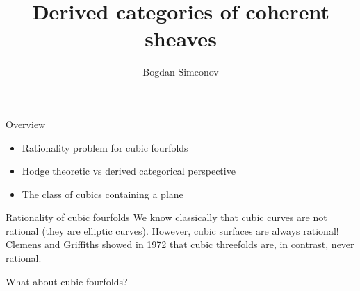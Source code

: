 \documentclass[10pt]{beamer}
\title{Derived categories of coherent sheaves}
\date{}
\author{Bogdan Simeonov}
\begin{document}
\maketitle

\begin{frame}{Overview}
    \begin{itemize}
        \pause
        \item Rationality problem for cubic fourfolds \pause
        \item Hodge theoretic vs derived categorical perspective \pause
        \item The class of cubics containing a plane 
    \end{itemize}
 
\end{frame}

\begin{frame}{Rationality of cubic fourfolds}
    We know classically that cubic curves are not rational (they are elliptic curves). However, cubic surfaces are always rational! Clemens and Griffiths showed in 1972 that cubic threefolds are, in contrast, never rational.

    What about cubic fourfolds?
\end{frame}
\end{document}
